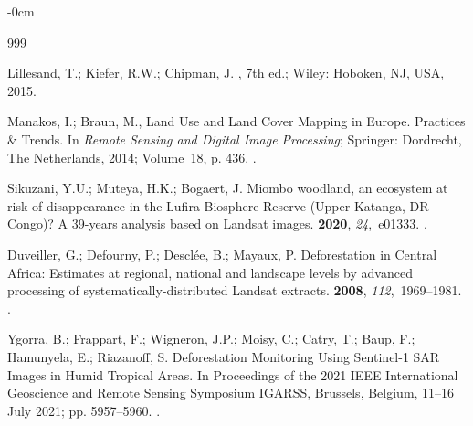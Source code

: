 \documentclass[applsci,article,accept,pdftex,moreauthors]{Definitions/mdpi}
\begin{document}
\begin{adjustwidth}{-\extralength}{0cm}


\begin{thebibliography}{999}

Lillesand, T.; Kiefer, R.W.; Chipman, J.
, 7th ed.; Wiley:  {Hoboken, NJ, USA,} %
  2015.

Manakos, I.; Braun, M., {Land Use and Land Cover Mapping in Europe. Practices
  \& Trends}.
\newblock In {\em Remote Sensing and Digital Image Processing}; Springer:
  Dordrecht, The Netherlands,  2014; Volume~18, p. 436.
.

Sikuzani, Y.U.; Muteya, H.K.; Bogaert, J.
\newblock Miombo woodland, an ecosystem at risk of disappearance in the Lufira
  Biosphere Reserve (Upper Katanga, DR Congo)? A 39-years analysis based on
  Landsat images.
 {\bf 2020}, {\em 24},~e01333.
.

Duveiller, G.; Defourny, P.; Desclée, B.; Mayaux, P.
\newblock Deforestation in Central Africa: Estimates at regional, national and
  landscape levels by advanced processing of systematically-distributed Landsat
  extracts.
 {\bf 2008}, {\em
  112},~{1969--1981.}
.

Ygorra, B.; Frappart, F.; Wigneron, J.P.; Moisy, C.; Catry, T.; Baup, F.;
  Hamunyela, E.; Riazanoff, S.
\newblock Deforestation Monitoring Using Sentinel-1 SAR Images in Humid
  Tropical Areas.
\newblock In Proceedings of the 2021 IEEE International Geoscience and Remote
  Sensing Symposium IGARSS,  {Brussels, Belgium, 11--16 July 2021;} 
 pp. 5957--5960.
.


\end{thebibliography}
\end{adjustwidth}
\end{document}
